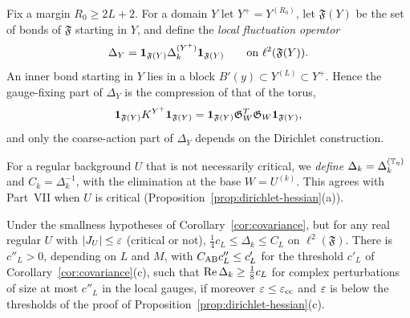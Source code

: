 Fix a margin $R_0\ge2L+2$. For a domain $Y$ let $Y^+=Y^{(R_0)}$, let $\mathfrak F(Y)$ be the set of bonds of $\mathfrak F$ starting in $Y$, and define the \emph{local fluctuation operator}
\[
\Delta_Y=\mathbf 1_{\mathfrak F(Y)}\Delta^{(Y^+)}_k\mathbf 1_{\mathfrak F(Y)}\qquad\text{on }\ell^2(\mathfrak F(Y)).
\]
An inner bond starting in $Y$ lies in a block $B'(y)\subset Y^{(L)}\subset Y^+$. Hence the gauge-fixing part of $\Delta_Y$ is the compression of that of the torus,
\begin{equation}\label{eq:gf-local-part}
\mathbf 1_{\mathfrak F(Y)}K^{Y^+}\mathbf 1_{\mathfrak F(Y)}=\mathbf 1_{\mathfrak F(Y)}\mathfrak G_W^T\mathfrak G_W\mathbf 1_{\mathfrak F(Y)} ,
\end{equation}
and only the coarse-action part of $\Delta_Y$ depends on the Dirichlet construction.

For a regular background $U$ that is not necessarily critical, we \emph{define} $\Delta_k=\Delta^{(\mathbb T_\eta)}_k$ and $C_k=\Delta_k^{-1}$, with the elimination at the base $W=U^{(k)}$. This agrees with Part~VII when $U$ is critical (Proposition~\ref{prop:dirichlet-hessian}(a)).

\begin{lemma}\label{lem:coercive-general}
Under the smallness hypotheses of Corollary~\ref{cor:covariance}, but for any real regular $U$ with $|J_U|\le\varepsilon$ (critical or not), $\frac14c_L\le\Delta_k\le C_L$ on $\ell^2(\mathfrak F)$. There is $c''_L>0$, depending on $L$ and $M$, with $C_{\rm AB}c''_L\le c'_L$ for the threshold $c'_L$ of Corollary~\ref{cor:covariance}(c), such that $\operatorname{Re}\Delta_k\ge\frac18c_L$ for complex perturbations of size at most $c''_L$ in the local gauges, if moreover $\varepsilon\le\varepsilon_{\rm cc}$ and $\varepsilon$ is below the thresholds of the proof of Proposition~\ref{prop:dirichlet-hessian}(c).
\end{lemma}

